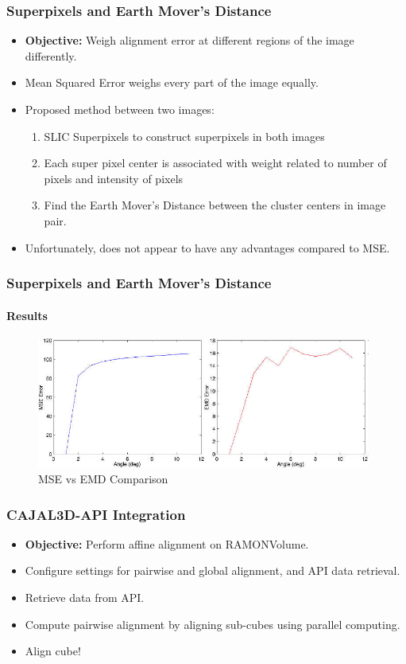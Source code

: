 \documentclass{beamer}
\begin{document}
\begin{frame}
\frametitle{Superpixels and Earth Mover's Distance}
\begin{itemize}
\item \textbf{Objective:} Weigh alignment error at different regions of the image differently.
\item Mean Squared Error weighs every part of the image equally.
\item Proposed method between two images:
\begin{enumerate}
\item SLIC Superpixels to construct superpixels in both images
\item Each super pixel center is associated with weight related to number of pixels and intensity of pixels
\item Find the Earth Mover's Distance between the cluster centers in image pair.
\end{enumerate}
\item Unfortunately, does not appear to have any advantages compared to MSE.
\end{itemize}
\end{frame}

\begin{frame}
\frametitle{Superpixels and Earth Mover's Distance}
\framesubtitle{Results}
\begin{figure}[p]
    \centering
    \includegraphics[width=11cm]{emderror.jpg}
    \caption{MSE vs EMD Comparison}
\end{figure}
\end{frame}

\begin{frame}
\frametitle{CAJAL3D-API Integration}
\begin{itemize}
\item \textbf{Objective:} Perform affine alignment on RAMONVolume. 
\item Configure settings for pairwise and global alignment, and API data retrieval. 
\item Retrieve data from API. 
\item Compute pairwise alignment by aligning sub-cubes using parallel computing. 
\item Align cube! 
\end{itemize}
\end{frame}
\end{document}
